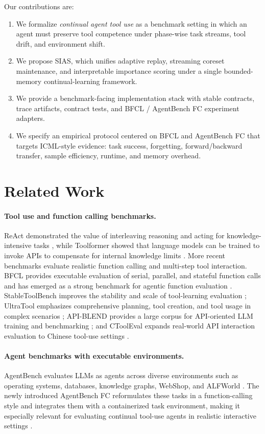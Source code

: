 \documentclass{article}
\begin{document}
Our contributions are:
\begin{enumerate}[leftmargin=14pt]
    \item We formalize \emph{continual agent tool use} as a benchmark setting in which an agent must preserve tool competence under phase-wise task streams, tool drift, and environment shift.
    \item We propose SIAS, which unifies adaptive replay, streaming coreset maintenance, and interpretable importance scoring under a single bounded-memory continual-learning framework.
    \item We provide a benchmark-facing implementation stack with stable contracts, trace artifacts, contract tests, and BFCL / AgentBench FC experiment adapters.
    \item We specify an empirical protocol centered on BFCL and AgentBench FC that targets ICML-style evidence: task success, forgetting, forward/backward transfer, sample efficiency, runtime, and memory overhead.
\end{enumerate}

\section{Related Work}

\paragraph{Tool use and function calling benchmarks.}
ReAct demonstrated the value of interleaving reasoning and acting for knowledge-intensive tasks \citep{yao2023react}, while Toolformer showed that language models can be trained to invoke APIs to compensate for internal knowledge limits \citep{schick2023toolformer}. More recent benchmarks evaluate realistic function calling and multi-step tool interaction. BFCL provides executable evaluation of serial, parallel, and stateful function calls and has emerged as a strong benchmark for agentic function evaluation \citep{patil2025bfcl}. StableToolBench improves the stability and scale of tool-learning evaluation \citep{qin2024stabletoolbench}; UltraTool emphasizes comprehensive planning, tool creation, and tool usage in complex scenarios \citep{ultratool2024}; API-BLEND provides a large corpus for API-oriented LLM training and benchmarking \citep{apiBlend2024}; and CToolEval expands real-world API interaction evaluation to Chinese tool-use settings \citep{ctooleval2024}.

\paragraph{Agent benchmarks with executable environments.}
AgentBench evaluates LLMs as agents across diverse environments such as operating systems, databases, knowledge graphs, WebShop, and ALFWorld \citep{liu2023agentbench}. The newly introduced AgentBench FC reformulates these tasks in a function-calling style and integrates them with a containerized task environment, making it especially relevant for evaluating continual tool-use agents in realistic interactive settings \citep{agentbenchfc2025}.
\end{document}
